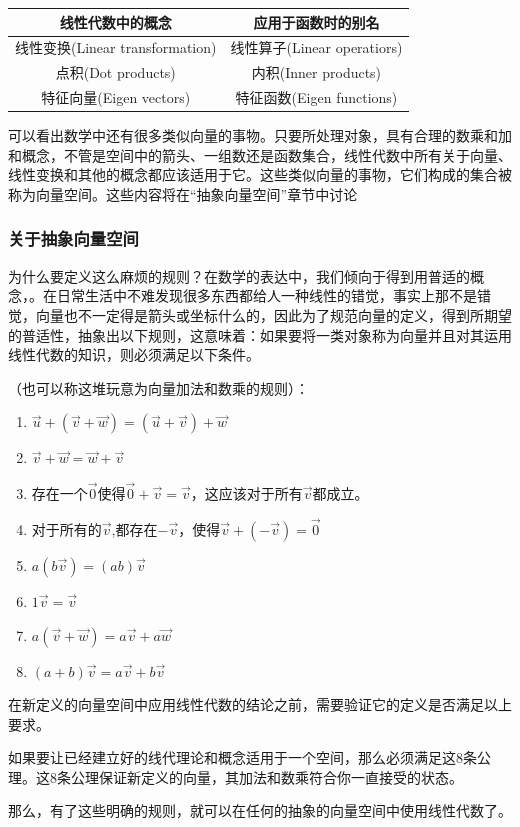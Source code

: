 \documentclass[UTF8]{ctexbook}
\begin{document}
{{{{  \begin{tabular}{c|c}
    \hline
    线性代数中的概念                & 应用于函数时的别名          \\
    \hline
    线性变换(Linear transformation) & 线性算子(Linear operatiors) \\
    点积(Dot products)              & 内积(Inner products)        \\
    特征向量(Eigen vectors)         & 特征函数(Eigen functions)
  \end{tabular}

  可以看出数学中还有很多类似向量的事物。只要所处理对象，具有合理的数乘和加和概念，不管是空间中的箭头、一组数还是函数集合，线性代数中所有关于向量、线性变换和其他的概念都应该适用于它。这些类似向量的事物，它们构成的集合被称为向量空间。这些内容将在“抽象向量空间”章节中讨论
}%

\subsubsection{关于抽象向量空间}{
为什么要定义这么麻烦的规则？在数学的表达中，我们倾向于得到用普适的概念，{}。在日常生活中不难发现很多东西都给人一种线性的错觉，事实上那不是错觉，向量也不一定得是箭头或坐标什么的，因此为了规范向量的定义，得到所期望的普适性，抽象出以下规则，这意味着：如果要将一类对象称为向量并且对其运用线性代数的知识，则必须满足以下条件。

（也可以称这堆玩意为向量加法和数乘的规则）：
\begin{enumerate}
  \item $\vec{u} + (\vec{v} + \vec{w}) = (\vec{u} + \vec{v}) + \vec{w}$
  \item $\vec{v} + \vec{w} = \vec{w} + \vec{v}$
  \item 存在一个$\vec{0}$使得$\vec{0} + \vec{v} = \vec{v}$，这应该对于所有$\vec{v}$都成立。
  \item 对于所有的$\vec{v}$,都存在$-\vec{v}$，使得$\vec{v} + (-\vec{v}) = \vec{0}$
  \item $a(b\vec{v}) = (ab)\vec{v}$
  \item $1\vec{v} = \vec{v}$
  \item $a(\vec{v} + \vec{w}) = a\vec{v} + a\vec{w}$
  \item $(a + b)\vec{v} = a\vec{v} + b\vec{v}$
\end{enumerate}

在新定义的向量空间中应用线性代数的结论之前，需要验证它的定义是否满足以上要求。

如果要让已经建立好的线代理论和概念适用于一个空间，那么必须满足这8条公理。这8条公理保证新定义的向量，其加法和数乘符合你一直接受的状态。

那么，有了这些明确的规则，就可以在任何{}的抽象的向量空间中使用线性代数了。
}%

}%

}%

}%
\end{document}
